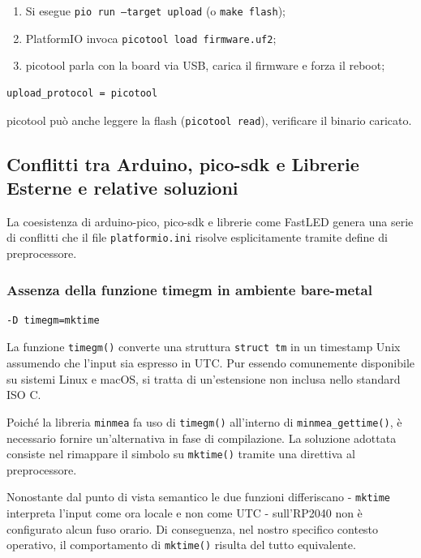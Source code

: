 \begin{enumerate}
	\item Si esegue \texttt{pio run --target upload} (o \texttt{make flash});
	
	\item PlatformIO invoca \texttt{picotool load firmware.uf2};
	
	\item picotool parla con la board via USB, carica il firmware e forza il reboot;
\end{enumerate}

\begin{lstlisting}[style=ini, caption={platformio.ini --- upload tool}]
	upload_protocol = picotool
\end{lstlisting}

picotool può anche leggere la flash (\texttt{picotool read}), verificare il binario caricato.

\subsection{Conflitti tra Arduino, pico-sdk e Librerie Esterne e relative soluzioni}
\label{sec:conflitti}

La coesistenza di arduino-pico, pico-sdk e librerie come FastLED genera una serie di conflitti che il file \texttt{platformio.ini} risolve esplicitamente tramite define di preprocessore.

\subsubsection*{Assenza della funzione timegm in ambiente bare-metal}

\begin{lstlisting}[style=ini]
	-D timegm=mktime
\end{lstlisting}

La funzione \texttt{timegm()} converte una struttura \texttt{struct tm} in un timestamp Unix assumendo che l'input sia espresso in UTC. Pur essendo comunemente disponibile su sistemi Linux e macOS, si tratta di un'estensione non inclusa nello standard ISO C.

Poiché la libreria \texttt{minmea} fa uso di \texttt{timegm()} all'interno di \texttt{minmea\_gettime()}, è necessario fornire un'alternativa in fase di compilazione. La soluzione adottata consiste nel rimappare il simbolo su \texttt{mktime()} tramite una direttiva al preprocessore.

Nonostante dal punto di vista semantico le due funzioni differiscano - \texttt{mktime} interpreta l'input come ora locale e non come UTC - sull'RP2040 non è configurato alcun fuso orario. Di conseguenza, nel nostro specifico contesto operativo, il comportamento di \texttt{mktime()} risulta del tutto equivalente.

